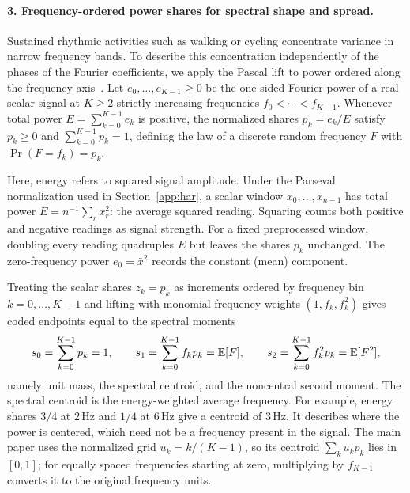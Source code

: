 \paragraph{3. Frequency-ordered power shares for spectral shape and spread.}
Sustained rhythmic activities such as walking or cycling concentrate variance in
narrow frequency bands. To describe this concentration independently of the
phases of the Fourier coefficients, we apply the Pascal lift to power ordered
along the frequency axis~\cite{mainpaper}. Let
\(e_0, \ldots, e_{K-1} \geq 0\) be the one-sided Fourier power of a real scalar
signal at \(K \geq 2\) strictly increasing frequencies \(f_0 < \cdots < f_{K-1}\).
Whenever total power \(E = \sum_{k=0}^{K-1} e_k\) is positive, the normalized
shares \(p_k = e_k / E\) satisfy \(p_k \geq 0\) and \(\sum_{k=0}^{K-1} p_k = 1\),
defining the law of a discrete random frequency \(F\) with \(\Pr(F = f_k) = p_k\).

Here, energy refers to squared signal amplitude. Under the Parseval normalization
used in Section~\ref{app:har}, a scalar window \(x_0,\ldots,x_{n-1}\) has total
power \(E=n^{-1}\sum_r x_r^2\): the average squared reading. Squaring counts
both positive and negative readings as signal strength. For a fixed preprocessed
window, doubling every reading quadruples \(E\) but leaves the shares \(p_k\)
unchanged. The zero-frequency power \(e_0=\bar x^2\) records the constant
(mean) component.

Treating the scalar shares \(z_k = p_k\) as increments ordered by frequency bin
\(k = 0, \ldots, K-1\) and lifting with monomial frequency weights
\((1, f_k, f_k^2)\) gives coded endpoints equal to the spectral moments
\[
 s_0 = \sum_{k=0}^{K-1} p_k = 1, \qquad
 s_1 = \sum_{k=0}^{K-1} f_k p_k = \mathbb{E}[F], \qquad
 s_2 = \sum_{k=0}^{K-1} f_k^2 p_k = \mathbb{E}[F^2],
\]
namely unit mass, the spectral centroid, and the noncentral second moment.
The spectral centroid is the energy-weighted average frequency. For example,
energy shares \(3/4\) at \(2\,\mathrm{Hz}\) and \(1/4\) at \(6\,\mathrm{Hz}\)
give a centroid of \(3\,\mathrm{Hz}\). It describes where the power is centered,
which need not be a frequency present in the signal. The main paper uses the
normalized grid \(u_k=k/(K-1)\), so its centroid \(\sum_k u_kp_k\) lies in
\([0,1]\); for equally spaced frequencies starting at zero, multiplying by
\(f_{K-1}\) converts it to the original frequency units.

